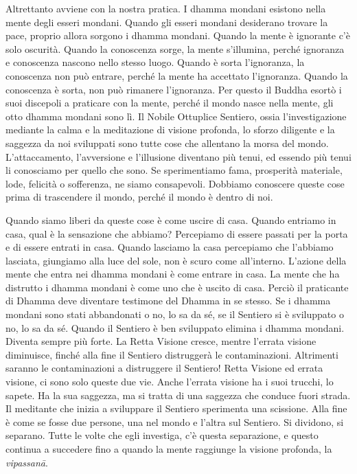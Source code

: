 Altrettanto avviene con la nostra pratica. I dhamma mondani
esistono nella mente degli esseri mondani. Quando gli esseri mondani
desiderano trovare la pace, proprio allora sorgono i dhamma
mondani. Quando la mente è ignorante c'è solo oscurità. Quando la
conoscenza sorge, la mente s'illumina, perché ignoranza e conoscenza
nascono nello stesso luogo. Quando è sorta l'ignoranza, la conoscenza
non può entrare, perché la mente ha accettato l'ignoranza. Quando la
conoscenza è sorta, non può rimanere l'ignoranza. Per questo il Buddha
esortò i suoi discepoli a praticare con la mente, perché il mondo nasce
nella mente, gli otto dhamma mondani sono lì. Il Nobile Ottuplice
Sentiero, ossia l'investigazione mediante la calma e la meditazione di
visione profonda, lo sforzo diligente e la saggezza da noi sviluppati
sono tutte cose che allentano la morsa del mondo. L'attaccamento,
l'avversione e l'illusione diventano più tenui, ed essendo più tenui li
conosciamo per quello che sono. Se sperimentiamo fama, prosperità
materiale, lode, felicità o sofferenza, ne siamo consapevoli. Dobbiamo
conoscere queste cose prima di trascendere il mondo, perché il mondo è
dentro di noi.

Quando siamo liberi da queste cose è come uscire di casa. Quando
entriamo in casa, qual è la sensazione che abbiamo? Percepiamo di essere
passati per la porta e di essere entrati in casa. Quando lasciamo la
casa percepiamo che l'abbiamo lasciata, giungiamo alla luce del sole,
non è scuro come all'interno. L'azione della mente che entra nei
dhamma mondani è come entrare in casa. La mente che ha distrutto
i dhamma mondani è come uno che è uscito di casa. Perciò il
praticante di Dhamma deve diventare testimone del Dhamma in se stesso.
Se i dhamma mondani sono stati abbandonati o no, lo sa da sé, se
il Sentiero si è sviluppato o no, lo sa da sé. Quando il Sentiero è ben
sviluppato elimina i dhamma mondani. Diventa sempre più forte. La
Retta Visione cresce, mentre l'errata visione diminuisce, finché alla
fine il Sentiero distruggerà le contaminazioni. Altrimenti saranno le
contaminazioni a distruggere il Sentiero! Retta Visione ed errata
visione, ci sono solo queste due vie. Anche l'errata visione ha i suoi
trucchi, lo sapete. Ha la sua saggezza, ma si tratta di una saggezza che
conduce fuori strada. Il meditante che inizia a sviluppare il Sentiero
sperimenta una scissione. Alla fine è come se fosse due persone, una nel
mondo e l'altra sul Sentiero. Si dividono, si separano. Tutte le volte
che egli investiga, c'è questa separazione, e questo continua a
succedere fino a quando la mente raggiunge la visione profonda, la
\emph{vipassanā}.

